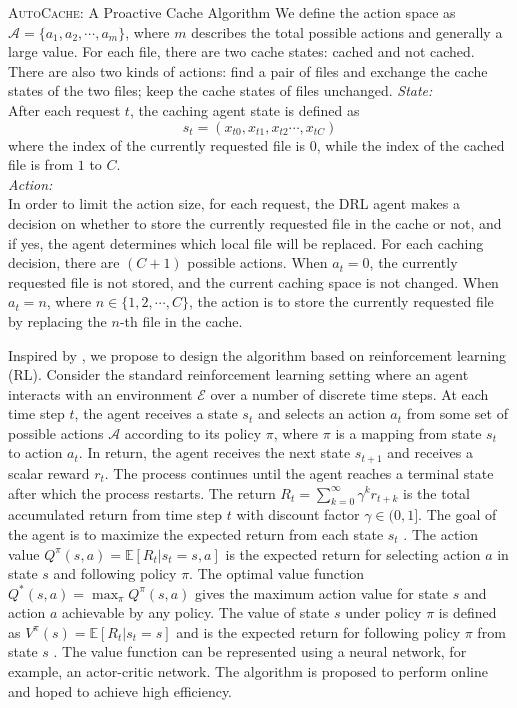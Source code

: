 \documentclass{article}
\begin{document}
\begin{section}{\textsc{AutoCache}: A Proactive Cache Algorithm}
    We define the action space as $\mathcal{A}=\{a_1,a_2,\cdots,a_m\}$, where $m$ describes the total possible actions and generally a large value. For each file, there are two cache states: cached and not cached. There are also two kinds of actions: find a pair of files and exchange the cache states of the two files; keep the cache states of files unchanged.
    \emph{State:}\\
    After each request $t$, the caching agent state is defined as
    $$
        s_t=\left(x_{t0},x_{t1},x_{t2}\cdots,x_{tC}\right)
    $$
    where the index of the currently requested file is $0$, while the index of the cached file is from $1$ to $C$.\\
    \emph{Action:}\\
    In order to limit the action size, for each request, the DRL agent makes a decision on whether to store the currently requested file in the cache or not, and if yes, the agent determines which local file will be replaced. For each caching decision, there are $(C+1)$ possible actions. When $a_t=0$, the currently requested file is not stored, and the current caching space is not changed. When $a_t=n$, where $n\in\{1,2,\cdots,C\}$, the action is to store the currently requested file by replacing the $n$-th file in the cache.

    Inspired by \cite{Pensieve}, we propose to design the algorithm based on reinforcement learning (RL). Consider the standard reinforcement learning setting where an agent interacts with an environment $\mathcal{E}$ over a number of discrete time steps. At each time step $t$, the agent receives a state $s_t$ and selects an action $a_t$ from some set of possible actions $\mathcal{A}$ according to its policy $\pi$, where $\pi$ is a mapping from state $s_t$ to action $a_t$. In return, the agent receives the next state $s_{t+1}$ and receives a scalar reward $r_t$. The process continues until the agent reaches a terminal state after which the process restarts. The return $R_t=\sum_{k=0}^{\infty}\gamma^k r_{t+k}$ is the total accumulated return from time step $t$ with discount factor $\gamma\in(0,1]$. The goal of the agent is to maximize the expected return from each state $s_t$ \cite{rl-intro}. The action value $Q^{\pi}(s,a)=\mathbb{E}[R_t|s_t=s,a]$ is the expected return for selecting action $a$ in state $s$ and following policy $\pi$. The optimal value function $Q^*(s,a)=\max_{\pi}Q^{\pi}(s,a)$ gives the maximum action value for state $s$ and action $a$ achievable by any policy. The value of state $s$ under policy $\pi$ is defined as $V^{\pi}(s)=\mathbb{E}[R_t|s_t=s]$ and is the expected return for following policy $\pi$ from state $s$ \cite{DBLP:journals/corr/MnihBMGLHSK16}. The value function can be represented using a neural network, for example, an actor-critic network. The algorithm is proposed to perform online and hoped to achieve high efficiency.


\end{section}
\end{document}
